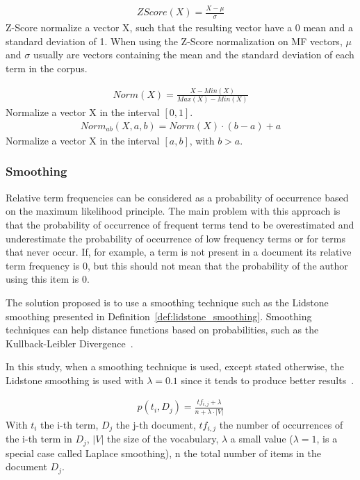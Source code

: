 \begin{definition}
  \label{def:z_score}
  \begin{gather*}
    ZScore(X) = \frac{X - \mu}{\sigma}
  \end{gather*}
  Z-Score normalize a vector X, such that the resulting vector have a 0 mean and a standard deviation of 1.
  When using the Z-Score normalization on MF vectors, $\mu$ and $\sigma$ usually are vectors containing the mean and the standard deviation of each term in the corpus.
\end{definition}

\begin{definition}
  \label{def:normalization}
  \begin{gather*}
    Norm(X) = \frac{X - Min(X)}{Max(X) - Min(X)}
  \end{gather*}
  Normalize a vector X in the interval $[0, 1]$.
  \begin{gather*}
    Norm_{ab}(X, a, b) = Norm(X) \cdot (b - a) + a
  \end{gather*}
  Normalize a vector X in the interval $[a, b]$, with $b > a$.
\end{definition}

\subsubsection{Smoothing}

Relative term frequencies can be considered as a probability of occurrence based on the maximum likelihood principle.
The main problem with this approach is that the probability of occurrence of frequent terms tend to be overestimated and underestimate the probability of occurrence of low frequency terms or for terms that never occur.
If, for example, a term is not present in a document its relative term frequency is 0, but this should not mean that the probability of the author using this item is 0.

The solution proposed is to use a smoothing technique such as the Lidstone smoothing presented in Definition~\ref{def:lidstone_smoothing}.
Smoothing techniques can help distance functions based on probabilities, such as the Kullback-Leibler Divergence~\cite{savoy_stylo}.

In this study, when a smoothing technique is used, except stated otherwise, the Lidstone smoothing is used with $\lambda = 0.1$ since it tends to produce better results~\cite{savoy_stylo}.

\begin{definition}
  \label{def:lidstone_smoothing}
  \begin{gather*}
    p(t_i, D_j) = \frac{tf_{i,j} + \lambda}{n + \lambda \cdot |V|}
  \end{gather*}
  With $t_i$ the i-th term, $D_j$ the j-th document, $tf_{i,j}$ the number of occurrences of the i-th term in $D_j$, $|V|$ the size of the vocabulary, $\lambda$ a small value ($\lambda = 1$, is a special case called Laplace smoothing), n the total number of items in the document $D_j$.
\end{definition}
